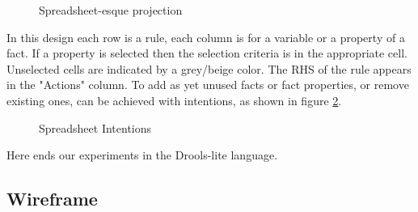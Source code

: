 \begin{figure}[h]
    \centering
    \caption{Spreadsheet-esque projection}
    \label{fig:SpreadsheetProjection}
\end{figure}

In this design each row is a rule, each column is for a variable or a property of a fact.
If a property is selected then the selection criteria is in the appropriate cell.
Unselected cells are indicated by a grey/beige color.
The RHS of the rule appears in the "Actions" column.
To add as yet unused facts or fact properties, or remove existing ones, can be achieved with intentions, as shown in figure \ref{fig:SpreadsheetIntentions}.

\begin{figure}[h]
    \centering
    \caption{Spreadsheet Intentions}
    \label{fig:SpreadsheetIntentions}
\end{figure}



Here ends our experiments in the Drools-lite language.

\subsection{Wireframe}